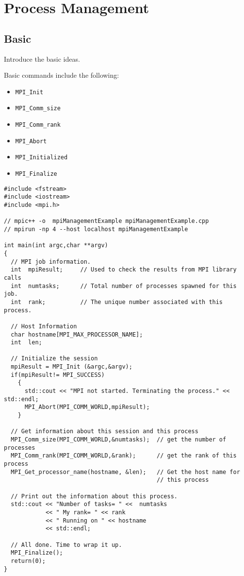 \chapter{Process Management}

\section{Basic}

\todo Introduce the basic ideas.

Basic commands include the following: \\
\begin{itemize}
\item \texttt{MPI\_Init}
\item \texttt{MPI\_Comm\_size}
\item \texttt{MPI\_Comm\_rank}
\item \texttt{MPI\_Abort}
\item \texttt{MPI\_Initialized}
\item \texttt{MPI\_Finalize}
\end{itemize}



\lstset{language=C++, numbers=left, numberstyle=\tiny, stepnumber=1,
  numbersep=5pt, commentstyle=\scriptsize}
\begin{lstlisting}[caption={Basic Process Information},
                   basicstyle=\scriptsize,
                   label=listing:basicProcess]
#include <fstream>
#include <iostream>
#include <mpi.h>

// mpic++ -o  mpiManagementExample mpiManagementExample.cpp 
// mpirun -np 4 --host localhost mpiManagementExample

int main(int argc,char **argv)
{
  // MPI job information.
  int  mpiResult;     // Used to check the results from MPI library calls
  int  numtasks;      // Total number of processes spawned for this job.
  int  rank;          // The unique number associated with this process.

  // Host Information 
  char hostname[MPI_MAX_PROCESSOR_NAME];
  int  len;

  // Initialize the session
  mpiResult = MPI_Init (&argc,&argv);
  if(mpiResult!= MPI_SUCCESS)
    {
      std::cout << "MPI not started. Terminating the process." << std::endl;
      MPI_Abort(MPI_COMM_WORLD,mpiResult);
    }

  // Get information about this session and this process 
  MPI_Comm_size(MPI_COMM_WORLD,&numtasks);  // get the number of processes
  MPI_Comm_rank(MPI_COMM_WORLD,&rank);      // get the rank of this process
  MPI_Get_processor_name(hostname, &len);   // Get the host name for
                                            // this process

  // Print out the information about this process.
  std::cout << "Number of tasks= " <<  numtasks
            << " My rank= " << rank
            << " Running on " << hostname
            << std::endl;

  // All done. Time to wrap it up.
  MPI_Finalize();
  return(0);
}
\end{lstlisting}


